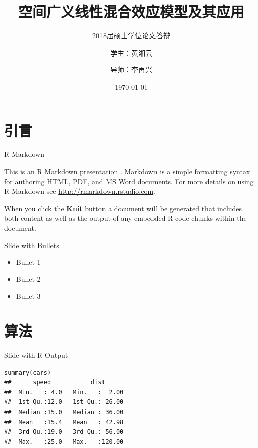 \documentclass[ignorenonframetext,hyperref,x11names,UTF8]{beamer}
\title{空间广义线性混合效应模型及其应用}
\subtitle{2018届硕士学位论文答辩}
\author{学生：黄湘云\and 导师：李再兴}
\institute{中国矿业大学（北京）\and 理学院}
\date{\today}
\providecommand{\tightlist}{%
  \setlength{\itemsep}{0pt}\setlength{\parskip}{0pt}}
\begin{document}
\frame{\titlepage}

\begin{frame}
\tableofcontents[hideallsubsections]
\end{frame}
\section{引言}

\begin{frame}{R Markdown}

This is an R Markdown presentation \citep{bookdown2016CRC}. Markdown is
a simple formatting syntax for authoring HTML, PDF, and MS Word
documents. For more details on using R Markdown see
\url{http://rmarkdown.rstudio.com}.

When you click the \textbf{Knit} button a document will be generated
that includes both content as well as the output of any embedded R code
chunks within the document.

\end{frame}

\begin{frame}{Slide with Bullets}

\begin{itemize}
\tightlist
\item
  Bullet 1
\item
  Bullet 2
\item
  Bullet 3
\end{itemize}

\end{frame}

\section{算法}

\begin{frame}[fragile]{Slide with R Output}

\begin{verbatim}
summary(cars)
##      speed           dist       
##  Min.   : 4.0   Min.   :  2.00  
##  1st Qu.:12.0   1st Qu.: 26.00  
##  Median :15.0   Median : 36.00  
##  Mean   :15.4   Mean   : 42.98  
##  3rd Qu.:19.0   3rd Qu.: 56.00  
##  Max.   :25.0   Max.   :120.00
\end{verbatim}

\end{frame}
\end{document}
